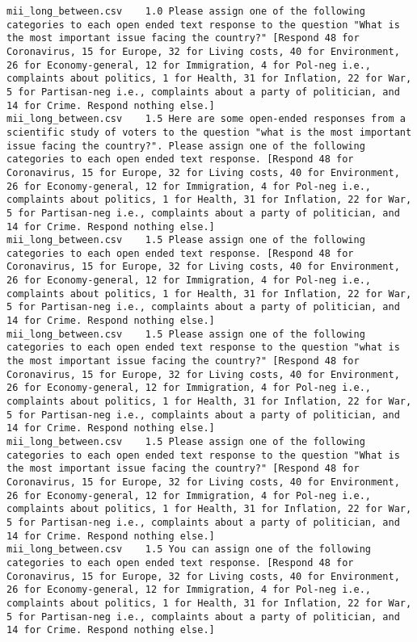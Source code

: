 \begin{lstlisting}
mii_long_between.csv	1.0	Please assign one of the following categories to each open ended text response to the question "What is the most important issue facing the country?" [Respond 48 for Coronavirus, 15 for Europe, 32 for Living costs, 40 for Environment, 26 for Economy-general, 12 for Immigration, 4 for Pol-neg i.e., complaints about politics, 1 for Health, 31 for Inflation, 22 for War, 5 for Partisan-neg i.e., complaints about a party of politician, and 14 for Crime. Respond nothing else.]
mii_long_between.csv	1.5	Here are some open-ended responses from a scientific study of voters to the question "what is the most important issue facing the country?". Please assign one of the following categories to each open ended text response. [Respond 48 for Coronavirus, 15 for Europe, 32 for Living costs, 40 for Environment, 26 for Economy-general, 12 for Immigration, 4 for Pol-neg i.e., complaints about politics, 1 for Health, 31 for Inflation, 22 for War, 5 for Partisan-neg i.e., complaints about a party of politician, and 14 for Crime. Respond nothing else.]
mii_long_between.csv	1.5	Please assign one of the following categories to each open ended text response. [Respond 48 for Coronavirus, 15 for Europe, 32 for Living costs, 40 for Environment, 26 for Economy-general, 12 for Immigration, 4 for Pol-neg i.e., complaints about politics, 1 for Health, 31 for Inflation, 22 for War, 5 for Partisan-neg i.e., complaints about a party of politician, and 14 for Crime. Respond nothing else.]
mii_long_between.csv	1.5	Please assign one of the following categories to each open ended text response to the question "what is the most important issue facing the country?" [Respond 48 for Coronavirus, 15 for Europe, 32 for Living costs, 40 for Environment, 26 for Economy-general, 12 for Immigration, 4 for Pol-neg i.e., complaints about politics, 1 for Health, 31 for Inflation, 22 for War, 5 for Partisan-neg i.e., complaints about a party of politician, and 14 for Crime. Respond nothing else.]
mii_long_between.csv	1.5	Please assign one of the following categories to each open ended text response to the question "What is the most important issue facing the country?" [Respond 48 for Coronavirus, 15 for Europe, 32 for Living costs, 40 for Environment, 26 for Economy-general, 12 for Immigration, 4 for Pol-neg i.e., complaints about politics, 1 for Health, 31 for Inflation, 22 for War, 5 for Partisan-neg i.e., complaints about a party of politician, and 14 for Crime. Respond nothing else.]
mii_long_between.csv	1.5	You can assign one of the following categories to each open ended text response. [Respond 48 for Coronavirus, 15 for Europe, 32 for Living costs, 40 for Environment, 26 for Economy-general, 12 for Immigration, 4 for Pol-neg i.e., complaints about politics, 1 for Health, 31 for Inflation, 22 for War, 5 for Partisan-neg i.e., complaints about a party of politician, and 14 for Crime. Respond nothing else.]

\end{lstlisting}
